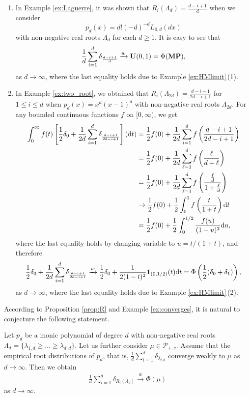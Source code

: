 \documentclass[pdftex]{sigma}
\numberwithin{equation}{section}
\newcommand{\calP}{\mathcal{P}}
\begin{document}
\begin{Example}\label{ex:converges}\quad
\begin{enumerate}\itemsep=0pt
\item[\rm (1)] In Example \ref{ex:Laguerre}, it was shown that $R_i(\Lambda_d)=\frac{d-i+1}{d}$ when we consider
\[
p_d(x)=d!(-d)^{-d}L_{0,d}(dx)
\] with non-negative real roots $\Lambda_d$ for each $d\ge 1$. It is easy to see that
\begin{align*}
\frac{1}{d}\sum_{i=1}^d \delta_{\frac{d-i+1}{d}}\xrightarrow{w} {\bf U}(0,1)=\Phi({\bf MP}),
\end{align*}
as $d\rightarrow\infty$, where the last equality holds due to Example \ref{ex:HMlimit}\,(1).

\item[\rm (2)] In Example \ref{ex:two_root}, we obtained that $R_i(\Lambda_{2d})=\frac{d-i+1}{2d-i+1}$ for $1\le i \le d$ when $p_d(x)=x^d(x-1)^d$ with non-negative real roots $\Lambda_{2d}$. For any bounded continuous functions $f$ on $[0,\infty)$, we get
\begin{align*}
\int_0^\infty f(t) \left[\frac{1}{2} \delta_0 + \frac{1}{2d} \sum_{i=1}^d \delta_{\frac{d-i+1}{2d-i+1}}\right] ({\rm d}t) &=\frac{1}{2} f(0) + \frac{1}{2d}\sum_{i=1}^d f\left(\frac{d-i+1}{2d-i+1}\right)\\
&=\frac{1}{2} f(0) + \frac{1}{2d}\sum_{\ell=1}^d f\left(\frac{\ell}{d+\ell}\right)\\
&=\frac{1}{2}f(0)+\frac{1}{2d} \sum_{\ell=1}^d f\left(\frac{\frac{\ell}{d}}{1+\frac{\ell}{d}} \right)\\
&\rightarrow \frac{1}{2} f(0) +\frac{1}{2}\int_0^1 f\left( \frac{t}{1+t}\right){\rm d}t\\
&=\frac{1}{2} f(0)+\frac{1}{2} \int_0^{1/2}  \frac{f(u)}{(1-u)^2}{\rm d}u,
\end{align*}
where the last equality holds by changing variable to $u=t/(1+t)$, and therefore
\[
\frac{1}{2} \delta_0 + \frac{1}{2d} \sum_{i=1}^d \delta_{\frac{d-i+1}{2d-i+1}} \xrightarrow{w} \frac{1}{2}\delta_0+ \frac{1}{2(1-t)^2}\mathbf{1}_{(0,1/2)}(t){\rm d}t= \Phi\left(\frac{1}{2}(\delta_0+\delta_1)\right),
\]
as $d\rightarrow\infty$, where the last equality holds due to Example \ref{ex:HMlimit}\,(2).
\end{enumerate}
\end{Example}

According to Proposition \ref{prop:R} and Example \ref{ex:converges}, it is natural to conjecture the following statement.

\begin{Conjecture}
Let $p_{d}$ be a monic polynomial of degree $d$ with non-negative real roots $\Lambda_d=\{\lambda_{1,d}\ge \dots \ge \lambda_{d,d}\}$. Let us further consider $\mu \in \calP_{+,c}$. Assume that the empirical root distributions of $p_d$, that is,
$\frac{1}{d}\sum_{i=1}^{d} \delta_{\lambda_{i,d}}$ converge weakly to $\mu$ as $d\rightarrow\infty$. Then we obtain%
\begin{align*}
\frac{1}{d}\sum_{i=1}^{d} \delta_{R_i(\Lambda_d)} \xrightarrow{w} \Phi(\mu)
\end{align*}
as $d\rightarrow\infty$.
\end{Conjecture}
\end{document}
